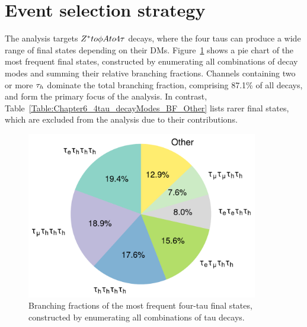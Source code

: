 \section{Event selection strategy}
\label{sec:ObjectAndEventSelections}

The analysis targets $Z^* to \phi A to 4\tau$ decays, where the four taus can produce a wide range of final states depending on their \acp{DM}. Figure~\ref{Figure:Chapter6_4tau_decayModes_BF} shows a pie chart of the most frequent final states, constructed by enumerating all combinations of decay modes and summing their relative branching fractions. Channels containing two or more $\tau_h$ dominate the total branching fraction, comprising 87.1\% of all decays, and form the primary focus of the analysis. In contrast, Table~\ref{Table:Chapter6_4tau_decayModes_BF_Other} lists rarer final states, which are excluded from the analysis due to their contributions.

\begin{figure}[!htbp]
  \centering
  \includegraphics[width=0.9\textwidth]{Figures/Chapter6/pie_BF.pdf}
    \caption[Branching fractions of the dominant four-tau decay modes.]
    {Branching fractions of the most frequent four-tau final states, constructed by enumerating all combinations of tau decays.}
  \label{Figure:Chapter6_4tau_decayModes_BF}
\end{figure}

